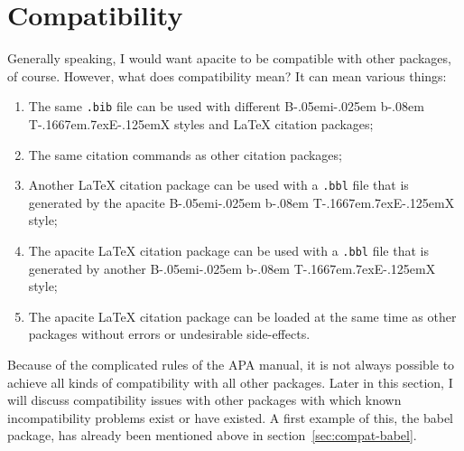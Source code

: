 \documentclass{article}
\def\BibTeX{{\rm B\kern-.05em{\sc i\kern-.025em b}\kern-.08em
    T\kern-.1667em\lower.7ex\hbox{E}\kern-.125emX}}%
\newcommand{\pkg}[1]{\textsf{#1}}%
\newcommand{\fname}[1]{\texttt{#1}}%
\begin{document}
\section{Compatibility}
\label{sec:compat}
Generally speaking, I would want \pkg{apacite} to be compatible with other
packages, of course. However, what does compatibility mean? It can mean
various things:
\begin{enumerate}
\item \label{compat1}%
      The same \fname{.bib} file can be used with
      different \BibTeX{} styles and \LaTeX{} citation packages;
\item \label{compat2}%
      The same citation commands as other citation packages;
\item \label{compat3}%
      Another \LaTeX{} citation package can be used with a
      \fname{.bbl} file that is generated by the \pkg{apacite}
      \BibTeX{} style;
\item \label{compat4}%
      The \pkg{apacite} \LaTeX{} citation package can be used with a
      \fname{.bbl} file that is generated by another \BibTeX{} style;
\item \label{compat5}%
      The \pkg{apacite} \LaTeX{} citation package can be loaded at the
      same time as other packages without errors or undesirable
      side-effects.
\end{enumerate}
Because of the complicated rules of the APA manual, it is not always possible
to achieve all kinds of compatibility with all other packages. Later in this
section, I will discuss compatibility issues with other packages with which
known incompatibility problems exist or have existed. A first example of this,
the \pkg{babel} package, has already been mentioned above in
section~\ref{sec:compat-babel}.
\end{document}
